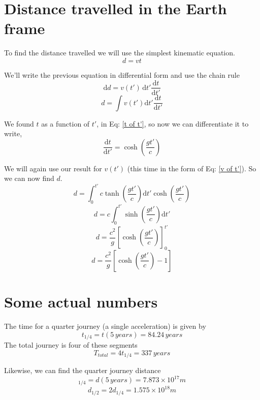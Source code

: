 \documentclass[10pt,a4paper]{article}
\begin{document}
\section{Distance travelled in the Earth frame}

To find the distance travelled we will use the simplest kinematic equation.
\begin{equation}
d=vt
\end{equation}

We'll write the previous equation in differential form and use the chain rule
\begin{equation}
\mathrm{d}d=v(t')
\,\mathrm{d}t'\frac{\mathrm{d}t}{\mathrm{d}t'}
\end{equation}
\begin{equation}
d=\int v(t')\mathrm{d}t'\frac{\mathrm{d}t}{\mathrm{d}t'}
\end{equation}

We found $t$ as a function of $t'$, in Eq: \ref{t of t'}, so now we can differentiate it to write,
\begin{equation}
\frac{\mathrm{d}t}{\mathrm{d}t'}=\cosh\left(\frac{gt'}{c}\right)
\end{equation}

We will again use our result for $v(t')$ (this time in the form of Eq: \ref{v of t'}). So we can now find $d$.
\begin{equation}
d=\int_0^{t'} c \tanh\left(\frac{gt'}{c}\right)\mathrm{d}t' \cosh\left(\frac{gt'}{c}\right)
\end{equation}
\begin{equation}
d=c\int_0^{t'} \sinh\left(\frac{gt'}{c}\right)\mathrm{d}t'
\end{equation}
\begin{equation}
d=\frac{c^2}{g}\left[\cosh\left(\frac{gt'}{c}\right)\right]_0^{t'}
\end{equation}
\begin{equation}\boxed{
d=\frac{c^2}{g}\left[\cosh\left(\frac{gt'}{c}\right)-1\right]
}\end{equation}

\section{Some actual numbers}
The time for a quarter journey (a single acceleration) is given by
\begin{equation}
t_{1/4}=t(5 \,years)=84.24 \,years
\end{equation}
The total journey is four of these segments
\begin{equation}
T_{total}=4t_{1/4}=337 \,years
\end{equation}

Likewise, we can find the quarter journey distance
\begin{equation}
_{1/4}=d(5 \,years)=7.873 \times 10^{17} m
\end{equation}
\begin{equation}
d_{1/2}=2d_{1/4}=1.575\times 10^{18} m
\end{equation}
\end{document}
